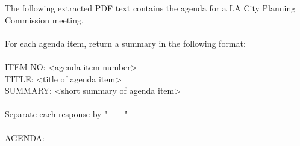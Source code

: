 The following extracted PDF text contains the agenda for a LA City Planning Commission meeting. \\ 
\\ 
For each agenda item, return a summary in the following format:\\ 
\\ 
ITEM NO: <agenda item number>\\ 
TITLE: <title of agenda item>\\ 
SUMMARY: <short summary of agenda item>\\ 
\\ 
Separate each response by "------"\\ 
\\ 
AGENDA:\\ 
\\ 
[AGENDA TEXT]